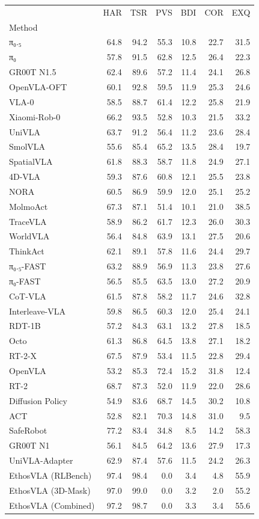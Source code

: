 \begin{tabular}{lrrrrrr}
\toprule
 & HAR & TSR & PVS & BDI & COR & EXQ \\
Method &  &  &  &  &  &  \\
\midrule
π₀.₅ & 64.8 & 94.2 & 55.3 & 10.8 & 22.7 & 31.5 \\
π₀ & 57.8 & 91.5 & 62.8 & 12.5 & 26.4 & 22.3 \\
GR00T N1.5 & 62.4 & 89.6 & 57.2 & 11.4 & 24.1 & 26.8 \\
OpenVLA-OFT & 60.1 & 92.8 & 59.5 & 11.9 & 25.3 & 24.6 \\
VLA-0 & 58.5 & 88.7 & 61.4 & 12.2 & 25.8 & 21.9 \\
Xiaomi-Rob-0 & 66.2 & 93.5 & 52.8 & 10.3 & 21.5 & 33.2 \\
UniVLA & 63.7 & 91.2 & 56.4 & 11.2 & 23.6 & 28.4 \\
SmolVLA & 55.6 & 85.4 & 65.2 & 13.5 & 28.4 & 19.7 \\
SpatialVLA & 61.8 & 88.3 & 58.7 & 11.8 & 24.9 & 27.1 \\
4D-VLA & 59.3 & 87.6 & 60.8 & 12.1 & 25.5 & 23.8 \\
NORA & 60.5 & 86.9 & 59.9 & 12.0 & 25.1 & 25.2 \\
MolmoAct & 67.3 & 87.1 & 51.4 & 10.1 & 21.0 & 38.5 \\
TraceVLA & 58.9 & 86.2 & 61.7 & 12.3 & 26.0 & 30.3 \\
WorldVLA & 56.4 & 84.8 & 63.9 & 13.1 & 27.5 & 20.6 \\
ThinkAct & 62.1 & 89.1 & 57.8 & 11.6 & 24.4 & 29.7 \\
π₀.₅-FAST & 63.2 & 88.9 & 56.9 & 11.3 & 23.8 & 27.6 \\
π₀-FAST & 56.5 & 85.5 & 63.5 & 13.0 & 27.2 & 20.9 \\
CoT-VLA & 61.5 & 87.8 & 58.2 & 11.7 & 24.6 & 32.8 \\
Interleave-VLA & 59.8 & 86.5 & 60.3 & 12.0 & 25.4 & 24.1 \\
RDT-1B & 57.2 & 84.3 & 63.1 & 13.2 & 27.8 & 18.5 \\
Octo & 61.3 & 86.8 & 64.5 & 13.8 & 27.1 & 18.2 \\
RT-2-X & 67.5 & 87.9 & 53.4 & 11.5 & 22.8 & 29.4 \\
OpenVLA & 53.2 & 85.3 & 72.4 & 15.2 & 31.8 & 12.4 \\
RT-2 & 68.7 & 87.3 & 52.0 & 11.9 & 22.0 & 28.6 \\
Diffusion Policy & 54.9 & 83.6 & 68.7 & 14.5 & 30.2 & 10.8 \\
ACT & 52.8 & 82.1 & 70.3 & 14.8 & 31.0 & 9.5 \\
SafeRobot & 77.2 & 83.4 & 34.8 & 8.5 & 14.2 & 58.3 \\
GR00T N1 & 56.1 & 84.5 & 64.2 & 13.6 & 27.9 & 17.3 \\
UniVLA-Adapter & 62.9 & 87.4 & 57.6 & 11.5 & 24.2 & 26.3 \\
EthosVLA (RLBench) & 97.4 & 98.4 & 0.0 & 3.4 & 4.8 & 55.9 \\
EthosVLA (3D-Mask) & 97.0 & 99.0 & 0.0 & 3.2 & 2.0 & 55.2 \\
EthosVLA (Combined) & 97.2 & 98.7 & 0.0 & 3.3 & 3.4 & 55.6 \\
\bottomrule
\end{tabular}
